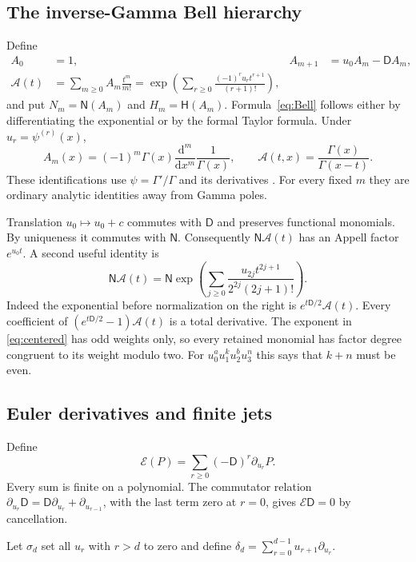 \documentclass[11pt]{article}
\numberwithin{equation}{section}
\theoremstyle{definition}\newtheorem{definition}[theorem]{Definition}
\theoremstyle{remark}\newtheorem{remark}[theorem]{Remark}
\newcommand{\NF}{\mathsf N}\newcommand{\Prim}{\mathsf H}
\newcommand{\D}{\mathsf D}\newcommand{\Euler}{\mathscr E}
\newcommand{\Acal}{\mathcal A}
\begin{document}
\subsection{The inverse-Gamma Bell hierarchy}
Define
\begin{align}
 A_0&=1,& A_{m+1}&=u_0A_m-\D A_m,\label{eq:Bell-recur}\\
 \Acal(t)&=\sum_{m\ge0}A_m\frac{t^m}{m!}
 =\exp\left(\sum_{r\ge0}\frac{(-1)^ru_rt^{r+1}}{(r+1)!}\right),
 \label{eq:Bell}\end{align}
and put $N_m=\NF(A_m)$ and $H_m=\Prim(A_m)$.
Formula~\eqref{eq:Bell} follows either by differentiating the exponential
or by the formal Taylor formula. Under $u_r=\psi^{(r)}(x)$,
\begin{equation}\label{eq:Gamma-realization}
 A_m(x)=(-1)^m\Gamma(x)\frac{\mathrm d^m}{\mathrm dx^m}\frac1{\Gamma(x)},
 \qquad \Acal(t,x)=\frac{\Gamma(x)}{\Gamma(x-t)}.
\end{equation}
These identifications use $\psi=\Gamma'/\Gamma$ and its derivatives
\cite{DLMF5}. For every fixed $m$ they are ordinary analytic identities
away from Gamma poles.

Translation $u_0\mapsto u_0+c$ commutes with $\D$ and preserves
functional monomials. By uniqueness it commutes with $\NF$. Consequently
$\NF\Acal(t)$ has an Appell factor $e^{u_0t}$. A second useful identity is
\begin{equation}\label{eq:centered}
 \NF\Acal(t)=\NF\exp\left(
 \sum_{j\ge0}\frac{u_{2j}t^{2j+1}}{2^{2j}(2j+1)!}\right).
\end{equation}
Indeed the exponential before normalization on the right is
$e^{t\D/2}\Acal(t)$. Every coefficient of
$(e^{t\D/2}-1)\Acal(t)$ is a total derivative. The exponent in
\eqref{eq:centered} has odd weights only, so every retained monomial has
factor degree congruent to its weight modulo two. For
$u_0^a u_1^k u_2^b u_3^n$ this says that $k+n$ must be even.

\subsection{Euler derivatives and finite jets}
Define
\[
 \Euler(P)=\sum_{r\ge0}(-\D)^r\partial_{u_r}P.
\]
Every sum is finite on a polynomial. The commutator relation
$\partial_{u_r}\D=\D\partial_{u_r}+\partial_{u_{r-1}}$, with the
last term zero at $r=0$, gives $\Euler\D=0$ by cancellation.

Let $\sigma_d$ set all $u_r$ with $r>d$ to zero and define
$\delta_d=\sum_{r=0}^{d-1}u_{r+1}\partial_{u_r}$.
\end{document}
